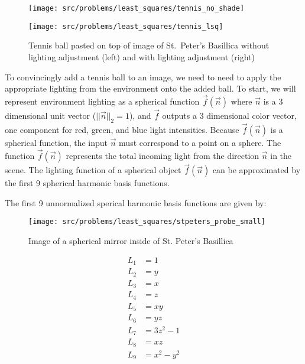 \documentclass[preview]{standalone}
\begin{document}
\begin{Parts}
	\begin{figure}
		\centering
		\begin{minipage}[b]{0.4\textwidth}
			\texttt{[image: src/problems/least\_squares/tennis\_no\_shade]}
		\end{minipage}
		\begin{minipage}[b]{0.4\textwidth}
			\texttt{[image: src/problems/least\_squares/tennis\_lsq]}
		\end{minipage}
		\caption{Tennis ball pasted on top of image of St.~Peter's Basillica without lighting adjustment (left) and with lighting adjustment (right)
		}
		\label{fig:noshade}
	\end{figure}
	
	To convincingly add a tennis ball to an image, we need to need to apply the appropriate lighting from the environment onto the added ball.  To start, we will represent environment lighting as a spherical function $\vec{f}(\vec{n})$ where $\vec{n}$ is a 3 dimensional unit vector ($\lvert\lvert\vec{n}\rvert\rvert_2=1$), and $\vec{f}$ outputs a 3 dimensional color vector, one component for red, green, and blue light intensities. Because $\vec{f}(\vec{n})$ is a spherical function, the input $\vec{n}$ must correspond to a point on a sphere. The function $\vec{f}(\vec{n})$ represents the total incoming light from the direction $\vec{n}$ in the scene.  The lighting function of a spherical object $\vec{f}(\vec{n})$ can be approximated by the first 9 spherical harmonic basis functions. 
	
	The first 9 unnormalized sperical harmonic basis functions are given by:
	
		
	\begin{figure}
		\centering
		\texttt{[image: src/problems/least\_squares/stpeters\_probe\_small]}
		\caption{Image of a spherical mirror inside of St. Peter's Basillica}
		\label{fig:probe}
	\end{figure}
	
	
	\begin{align*}
		L_{1}&=1\\
		L_{2}&=y\\
		L_{3}&=x\\
		L_{4}&=z\\
		L_{5}&=xy\\
		L_{6}&=yz\\
		L_{7}&=3z^2-1\\
		L_{8}&=xz\\
		L_{9}&=x^2-y^2
	\end{align*}
	

\end{Parts}
\end{document}
